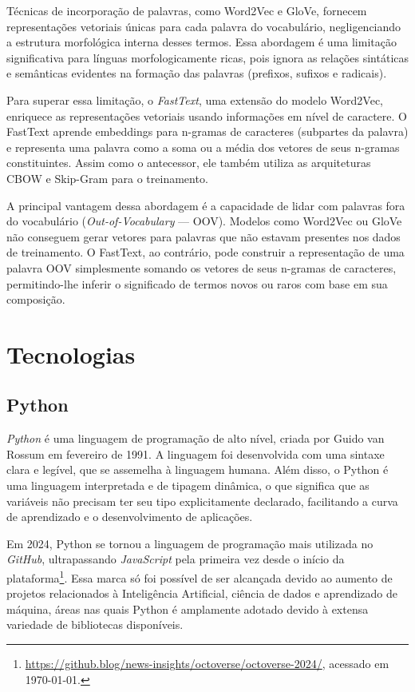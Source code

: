 Técnicas de incorporação de palavras, como Word2Vec e GloVe, fornecem representações vetoriais únicas para cada palavra do vocabulário, negligenciando a estrutura morfológica interna desses termos. Essa abordagem é uma limitação significativa para línguas morfologicamente ricas, pois ignora as relações sintáticas e semânticas evidentes na formação das palavras (prefixos, sufixos e radicais).

Para superar essa limitação, o \textit{FastText}, uma extensão do modelo Word2Vec, enriquece as representações vetoriais usando informações em nível de caractere. O FastText aprende embeddings para n-gramas de caracteres (subpartes da palavra) e representa uma palavra como a soma ou a média dos vetores de seus n-gramas constituintes. Assim como o antecessor, ele também utiliza as arquiteturas CBOW e Skip-Gram para o treinamento.

A principal vantagem dessa abordagem é a capacidade de lidar com palavras fora do vocabulário (\textit{Out-of-Vocabulary} — OOV). Modelos como Word2Vec ou GloVe não conseguem gerar vetores para palavras que não estavam presentes nos dados de treinamento. O FastText, ao contrário, pode construir a representação de uma palavra OOV simplesmente somando os vetores de seus n-gramas de caracteres, permitindo-lhe inferir o significado de termos novos ou raros com base em sua composição. \cite{bojanowski-etal-2017-enriching}

\section{Tecnologias}

\subsection{Python}

\textit{Python} é uma linguagem de programação de alto nível, criada por Guido van Rossum em fevereiro de 1991. A linguagem foi desenvolvida com uma sintaxe clara e legível, que se assemelha à linguagem humana. Além disso, o Python é uma linguagem interpretada e de tipagem dinâmica, o que significa que as variáveis não precisam ter seu tipo explicitamente declarado, facilitando a curva de aprendizado e o desenvolvimento de aplicações.

Em 2024, Python se tornou a linguagem de programação mais utilizada no \textit{GitHub}, ultrapassando \textit{JavaScript} pela primeira vez desde o início da plataforma\footnote{\url{https://github.blog/news-insights/octoverse/octoverse-2024/}, acessado em \today.}. Essa marca só foi possível de ser alcançada devido ao aumento de projetos relacionados à Inteligência Artificial, ciência de dados e aprendizado de máquina, áreas nas quais Python é amplamente adotado devido à extensa variedade de bibliotecas disponíveis. 

